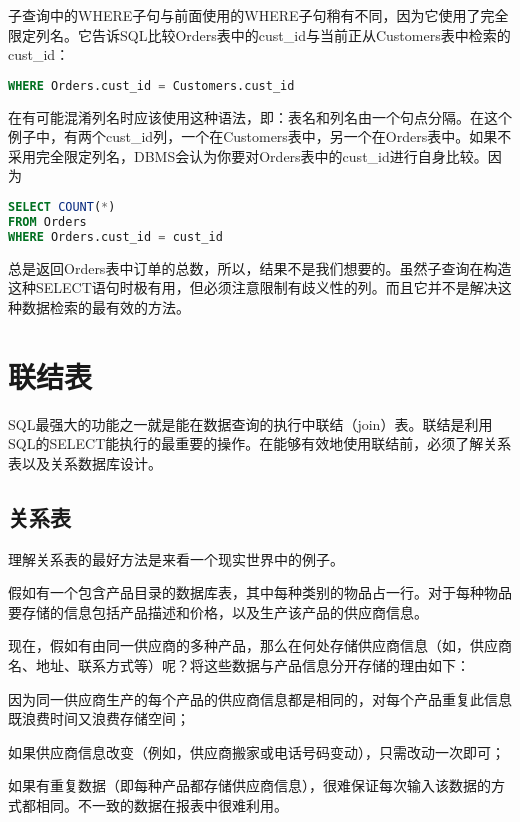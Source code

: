 子查询中的WHERE子句与前面使用的WHERE子句稍有不同，因为它使用了完全限定列名。它告诉SQL比较Orders表中的cust\_id与当前正从Customers表中检索的cust\_id：

\begin{lstlisting}[language=SQL]
WHERE Orders.cust_id = Customers.cust_id
\end{lstlisting}

在有可能混淆列名时应该使用这种语法，即：表名和列名由一个句点分隔。在这个例子中，有两个cust\_id列，一个在Customers表中，另一个在Orders表中。如果不采用完全限定列名，DBMS会认为你要对Orders表中的cust\_id进行自身比较。因为

\begin{lstlisting}[language=SQL]
SELECT COUNT(*)
FROM Orders
WHERE Orders.cust_id = cust_id
\end{lstlisting}

总是返回Orders表中订单的总数，所以，结果不是我们想要的。虽然子查询在构造这种SELECT语句时极有用，但必须注意限制有歧义性的列。而且它并不是解决这种数据检索的最有效的方法。
\section{联结表}

SQL最强大的功能之一就是能在数据查询的执行中联结（join）表。联结是利用SQL的SELECT能执行的最重要的操作。在能够有效地使用联结前，必须了解关系表以及关系数据库设计。
\subsection{关系表}

理解关系表的最好方法是来看一个现实世界中的例子。

假如有一个包含产品目录的数据库表，其中每种类别的物品占一行。对于每种物品要存储的信息包括产品描述和价格，以及生产该产品的供应商信息。

现在，假如有由同一供应商的多种产品，那么在何处存储供应商信息（如，供应商名、地址、联系方式等）呢？将这些数据与产品信息分开存储的理由如下：

\begin{compactitem}
\item 因为同一供应商生产的每个产品的供应商信息都是相同的，对每个产品重复此信息既浪费时间又浪费存储空间；
\item 如果供应商信息改变（例如，供应商搬家或电话号码变动），只需改动一次即可；
\item 如果有重复数据（即每种产品都存储供应商信息），很难保证每次输入该数据的方式都相同。不一致的数据在报表中很难利用。
\end{compactitem}


